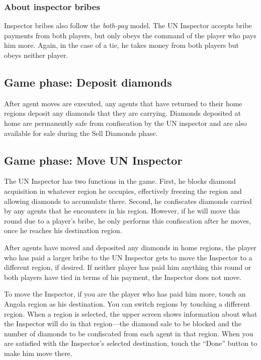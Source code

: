 \documentclass[8pt]{extbook}
\begin{document}
\subsubsection{About inspector bribes}
Inspector bribes also follow the {\it both-pay} model.  The UN Inspector accepts bribe payments from both players, but only obeys the command of the player who pays him more.  Again, in the case of a tie, he takes money from both players but obeys neither player.

\subsection{Game phase:  Deposit diamonds}
\label{sec:depositPhase}

After agent moves are executed, any agents that have returned to their home regions deposit any diamonds that they are carrying.  Diamonds deposited at home are permanently safe from confiscation by the UN inspector and are also available for sale during the Sell Diamonds phase.

\subsection{Game phase:  Move UN Inspector}
\label{sec:inspectorPhase}

The UN Inspector has two functions in the game.  First, he blocks diamond acquisition in whatever region he occupies, effectively freezing the region and allowing diamonds to accumulate there.  Second, he confiscates diamonds carried by any agents that he encounters in his region.  However, if he will move this round due to a player's bribe, he only performs this confiscation after he moves, once he reaches his destination region.

After agents have moved and deposited any diamonds in home regions, the player who has paid a larger bribe to the UN Inspector gets to move the Inspector to a different region, if desired.  If neither player has paid him anything this round or both players have tied in terms of his payment, the Inspector does not move.

To move the Inspector, if you are the player who has paid him more, touch an Angola region as his destination.  You can switch regions by touching a different region.  When a region is selected, the upper screen shows information about what the Inspector will do in that region---the diamond sale to be blocked and the number of diamonds to be confiscated from each agent in that region.  When you are satisfied with the Inspector's selected destination, touch the ``Done'' button to make him move there.
\end{document}

